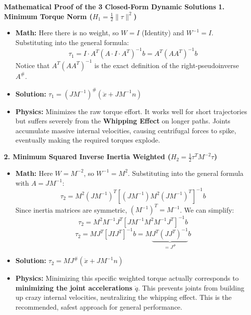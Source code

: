 \documentclass[11pt,a4paper]{article}
\begin{document}
\textbf{Mathematical Proof of the 3 Closed-Form Dynamic Solutions}
\textbf{1. Minimum Torque Norm ($H_1 = \frac{1}{2} \|\tau\|^2$)}
\begin{itemize}
    \item \textbf{Math:} Here there is no weight, so $W = I$ (Identity) and $W^{-1} = I$. Substituting into the general formula:
    $$ \tau_1 = I \cdot A^T (A \cdot I \cdot A^T)^{-1} b = A^T(AA^T)^{-1}b $$
    Notice that $A^T(AA^T)^{-1}$ is the exact definition of the right-pseudoinverse $A^\#$.
    \item \textbf{Solution:} $\tau_1 = (J M^{-1})^\# (\ddot{x} + J M^{-1} n)$
    \item \textbf{Physics:} Minimizes the raw torque effort. It works well for short trajectories but suffers severely from the \textbf{Whipping Effect} on longer paths. Joints accumulate massive internal velocities, causing centrifugal forces to spike, eventually making the required torques explode.
\end{itemize}

\vspace{2mm}
\textbf{2. Minimum Squared Inverse Inertia Weighted ($H_2 = \frac{1}{2} \tau^T M^{-2} \tau$)}
\begin{itemize}
    \item \textbf{Math:} Here $W = M^{-2}$, so $W^{-1} = M^2$. Substituting into the general formula with $A = JM^{-1}$:
    $$ \tau_2 = M^2 (JM^{-1})^T \left[ (JM^{-1}) M^2 (JM^{-1})^T \right]^{-1} b $$
    Since inertia matrices are symmetric, $(M^{-1})^T = M^{-1}$. We can simplify:
    $$ \tau_2 = M^2 M^{-1} J^T \left[ J M^{-1} M^2 M^{-1} J^T \right]^{-1} b $$
    $$ \tau_2 = M J^T \left[ J I J^T \right]^{-1} b = M \underbrace{J^T (J J^T)^{-1}}_{= J^\#} b $$
    \item \textbf{Solution:} $\tau_2 = M J^\# (\ddot{x} + J M^{-1} n)$
    \item \textbf{Physics:} Minimizing this specific weighted torque actually corresponds to \textbf{minimizing the joint accelerations $\ddot{q}$}. This prevents joints from building up crazy internal velocities, neutralizing the whipping effect. This is the recommended, safest approach for general performance.
\end{itemize}
\end{document}
